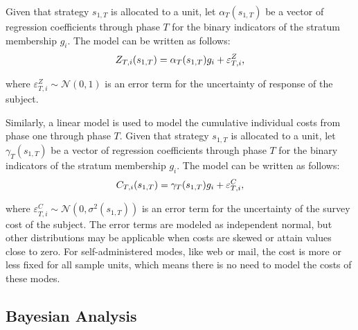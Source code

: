 \documentclass[12pt]{article}
\begin{document}
Given that strategy $s_{1,T}$ is allocated to a unit, let $\alpha_{T}(s_{1,T})$ be a vector of regression coefficients through phase $T$ for the binary indicators of the stratum membership $g_{i}$. The model can be written as follows:
\let\saveeqnno\theequation
\let\savefrac\frac
\def\dispfrac{\displaystyle\savefrac}
\begin{eqnarray}
\let\frac\dispfrac
\gdef\theequation{4}
\let\theHequation\theequation
\label{equation-latent-response}
	Z_{T,i}(s_{1,T})=\alpha_{T}(s_{1,T})g_{i}+\varepsilon^{Z}_{T,i},
\end{eqnarray}
\global\let\theequation\saveeqnno
\addtocounter{equation}{-1}\ignorespaces

where $\varepsilon^{Z}_{T,i} \sim \mathcal{N}(0,1)$ is an error term for the uncertainty of response of the subject.


Similarly, a linear model is used to model the cumulative individual costs from phase one through phase $T$. Given that strategy $s_{1,T}$ is allocated to a unit, let $\gamma_{T}(s_{1,T})$ be a vector of regression coefficients through phase $T$ for the binary indicators of the stratum membership $g_{i}$. The model can be written as follows:
\let\saveeqnno\theequation
\let\savefrac\frac
\def\dispfrac{\displaystyle\savefrac}
\begin{eqnarray}
\let\frac\dispfrac
\gdef\theequation{5}
\let\theHequation\theequation
\label{equation-cost}
	C_{T,i}(s_{1,T})=\gamma_{T}(s_{1,T})g_{i}+\varepsilon^{C}_{T,i},
\end{eqnarray}
\global\let\theequation\saveeqnno
\addtocounter{equation}{-1}\ignorespaces

where $\varepsilon^{C}_{T,i} \sim \mathcal{N}\left(0,\sigma^2(s_{1,T})\right)$ is an error term for the uncertainty of the survey cost of the subject. The error terms are modeled as independent normal, but other distributions may be applicable when costs are skewed or attain values close to zero.
For self-administered modes, like web or mail, the cost is more or less fixed for all sample units, which means there is no need to model the costs of these modes.


\subsection{Bayesian Analysis}
\label{subsec:bayesian-analysis}
\end{document}
